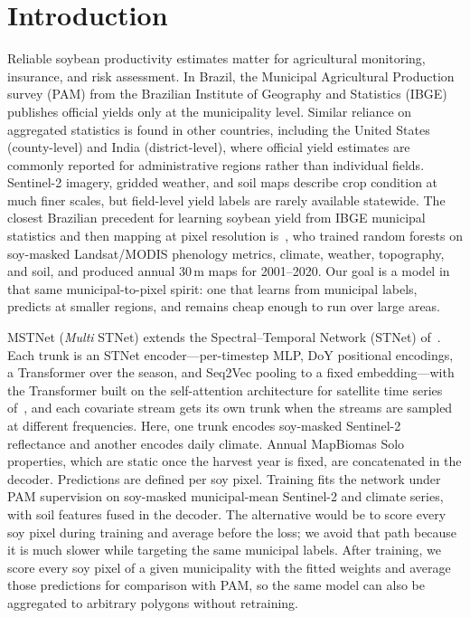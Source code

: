 \section{Introduction}
\label{sec:introduction}

Reliable soybean productivity estimates matter for agricultural monitoring, insurance, and risk assessment.
In Brazil, the Municipal Agricultural Production survey (PAM) from the Brazilian Institute of Geography and Statistics (IBGE) publishes official yields only at the municipality level.
Similar reliance on aggregated statistics is found in other countries, including the United States (county-level) and India (district-level), where official yield estimates are commonly reported for administrative regions rather than individual fields.
Sentinel-2 imagery, gridded weather, and soil maps describe crop condition at much finer scales, but field-level yield labels are rarely available statewide.
The closest Brazilian precedent for learning soybean yield from IBGE municipal statistics and then mapping at pixel resolution is~\citet{song2022soy}, who trained random forests on soy-masked Landsat/{MODIS} phenology metrics, climate, weather, topography, and soil, and produced annual 30\,m maps for 2001--2020.
Our goal is a model in that same municipal-to-pixel spirit: one that learns from municipal labels, predicts at smaller regions, and remains cheap enough to run over large areas.

MSTNet (\emph{Multi} STNet) extends the Spectral--Temporal Network (STNet) of~\citet{xu2024sitsmoco}.
Each trunk is an STNet encoder---per-timestep MLP, DoY positional encodings, a Transformer over the season, and Seq2Vec pooling to a fixed embedding---with the Transformer built on the self-attention architecture for satellite time series of~\citet{russwurm2020selfattention}, and each covariate stream gets its own trunk when the streams are sampled at different frequencies.
Here, one trunk encodes soy-masked Sentinel-2 reflectance and another encodes daily climate.
Annual MapBiomas Solo properties, which are static once the harvest year is fixed, are concatenated in the decoder.
Predictions are defined per soy pixel.
Training fits the network under PAM supervision on soy-masked municipal-mean Sentinel-2 and climate series, with soil features fused in the decoder.
The alternative would be to score every soy pixel during training and average before the loss; we avoid that path because it is much slower while targeting the same municipal labels.
After training, we score every soy pixel of a given municipality with the fitted weights and average those predictions for comparison with PAM, so the same model can also be aggregated to arbitrary polygons without retraining.

